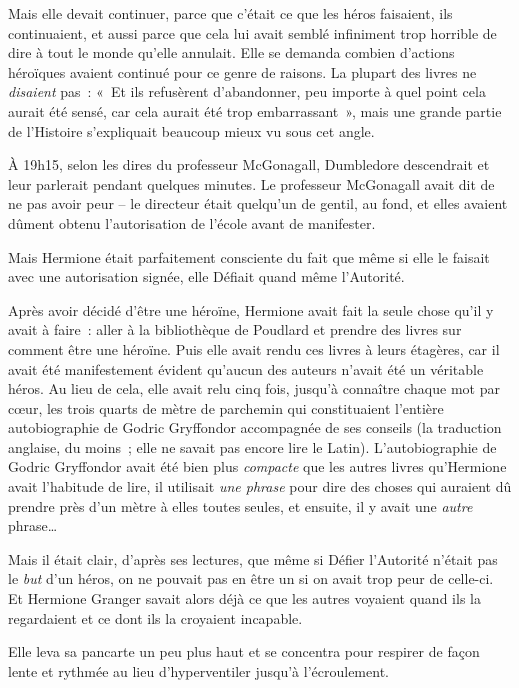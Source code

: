 Mais elle devait continuer, parce que c'était ce que les héros faisaient, ils continuaient, et aussi parce que cela lui avait semblé infiniment trop horrible de dire à tout le monde qu'elle annulait.
Elle se demanda combien d'actions héroïques avaient continué pour ce genre de raisons.
La plupart des livres ne \emph{disaient} pas~: «~Et ils refusèrent d'abandonner, peu importe à quel point cela aurait été sensé, car cela aurait été trop embarrassant~», mais une grande partie de l'Histoire s'expliquait beaucoup mieux vu sous cet angle.

À 19h15, selon les dires du professeur McGonagall, Dumbledore descendrait et leur parlerait pendant quelques minutes.
Le professeur McGonagall avait dit de ne pas avoir peur -- le directeur était quelqu'un de gentil, au fond, et elles avaient dûment obtenu l'autorisation de l'école avant de manifester.

Mais Hermione était parfaitement consciente du fait que même si elle le faisait avec une autorisation signée, elle Défiait quand même l'Autorité.

Après avoir décidé d'être une héroïne, Hermione avait fait la seule chose qu'il y avait à faire~: aller à la bibliothèque de Poudlard et prendre des livres sur comment être une héroïne.
Puis elle avait rendu ces livres à leurs étagères, car il avait été manifestement évident qu'aucun des auteurs n'avait été un véritable héros.
Au lieu de cela, elle avait relu cinq fois, jusqu'à connaître chaque mot par cœur, les trois quarts de mètre de parchemin qui constituaient l'entière autobiographie de Godric Gryffondor accompagnée de ses conseils (la traduction anglaise, du moins~; elle ne savait pas encore lire le Latin).
L'autobiographie de Godric Gryffondor avait été bien plus \emph{compacte} que les autres livres qu'Hermione avait l'habitude de lire, il utilisait \emph{une phrase} pour dire des choses qui auraient dû prendre près d'un mètre à elles toutes seules, et ensuite, il y avait une \emph{autre} phrase…

Mais il était clair, d'après ses lectures, que même si Défier l'Autorité n'était pas le \emph{but} d'un héros, on ne pouvait pas en être un si on avait trop peur de celle-ci.
Et Hermione Granger savait alors déjà ce que les autres voyaient quand ils la regardaient et ce dont ils la croyaient incapable.

Elle leva sa pancarte un peu plus haut et se concentra pour respirer de façon lente et rythmée au lieu d'hyperventiler jusqu'à l'écroulement.


